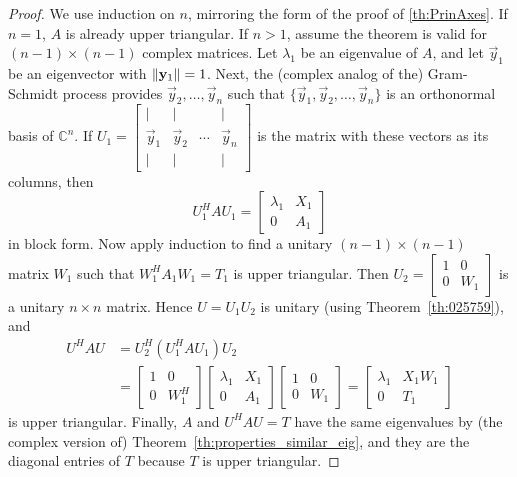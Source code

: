 \documentclass{ximera}
\begin{document}
\begin{proof}
We use induction on $n$, mirroring the form of the proof of \ref{th:PrinAxes}. If $n = 1$, $A$ is already upper triangular. If $n > 1$, assume the theorem is valid for $(n - 1) \times (n - 1)$ complex matrices. Let $\lambda_{1}$ be an eigenvalue of $A$, and let $\vec{y}_{1}$ be an eigenvector with $\left\lVert\mathbf{y}_{1}\right\rVert = 1$. Next, the (complex analog of the) Gram-Schmidt process provides $\vec{y}_{2}, \ldots, \vec{y}_{n}$ such that $\{\vec{y}_{1}, \vec{y}_{2}, \ldots, \vec{y}_{n}\}$ is an orthonormal basis of $\mathbb{C}^n$. If $U_{1} = \left[ \begin{array}{cccc}
| & | & & | \\
\vec{y}_{1} & \vec{y}_{2} & \cdots & \vec{y}_{n} \\
| & | & & |
\end{array}\right]$ is the matrix with these vectors as its columns, then
\begin{equation*}
U_{1}^HAU_{1} = \left[ \begin{array}{cc}
\lambda_{1} & X_{1} \\
0 & A_{1}
\end{array}\right]
\end{equation*}
in block form. Now apply induction to find a unitary $(n - 1) \times (n - 1)$ matrix $W_{1}$ such that $W_{1}^HA_{1}W_{1} = T_{1}$
 is upper triangular. Then $U_{2} = \left[ \begin{array}{cc}
 1 & 0 \\
 0 & W_{1}
 \end{array}\right]$
 is a unitary $n \times n$ matrix. Hence $U = U_{1}U_{2}$ is unitary (using Theorem~\ref{th:025759}), and
\begin{align*}
U^HAU &= U_{2}^H(U_{1}^HAU_{1})U_{2} \\
	   &= \left[ \begin{array}{cc}
	   1 & 0 \\
	   0 & W_{1}^H
	   \end{array}\right] \left[ \begin{array}{cc}
   	   \lambda_{1} & X_{1} \\
	   0 & A_{1}
	   \end{array}\right] \left[ \begin{array}{cc}
	   1 & 0 \\
	   0 & W_{1}
	   \end{array}\right] = \left[ \begin{array}{cc}
	   \lambda_{1} & X_{1}W_{1} \\
	   0 & T_{1}
	   \end{array}\right]
\end{align*}
is upper triangular. Finally, $A$ and $U^{H}AU = T$ have the same eigenvalues by (the complex version of) Theorem~\ref{th:properties_similar_eig}, and they are the diagonal entries of $T$ because $T$ is upper triangular.
\end{proof}
\end{document}
